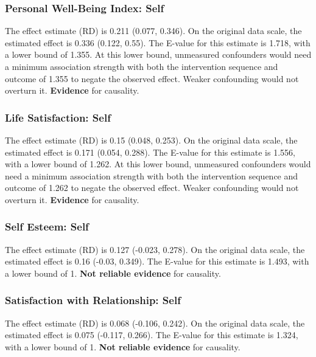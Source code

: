 \documentclass[
  singlecolumn]{article}
\begin{document}
\subsubsection{Personal Well-Being Index:
Self}\label{personal-well-being-index-self-11}

The effect estimate (RD) is 0.211 (0.077, 0.346). On the original data
scale, the estimated effect is 0.336 (0.122, 0.55). The E-value for this
estimate is 1.718, with a lower bound of 1.355. At this lower bound,
unmeasured confounders would need a minimum association strength with
both the intervention sequence and outcome of 1.355 to negate the
observed effect. Weaker confounding would not overturn it.
\textbf{Evidence} for causality.

\subsubsection{Life Satisfaction: Self}\label{life-satisfaction-self-11}

The effect estimate (RD) is 0.15 (0.048, 0.253). On the original data
scale, the estimated effect is 0.171 (0.054, 0.288). The E-value for
this estimate is 1.556, with a lower bound of 1.262. At this lower
bound, unmeasured confounders would need a minimum association strength
with both the intervention sequence and outcome of 1.262 to negate the
observed effect. Weaker confounding would not overturn it.
\textbf{Evidence} for causality.

\subsubsection{Self Esteem: Self}\label{self-esteem-self-11}

The effect estimate (RD) is 0.127 (-0.023, 0.278). On the original data
scale, the estimated effect is 0.16 (-0.03, 0.349). The E-value for this
estimate is 1.493, with a lower bound of 1. \textbf{Not reliable
evidence} for causality.

\subsubsection{Satisfaction with Relationship:
Self}\label{satisfaction-with-relationship-self-11}

The effect estimate (RD) is 0.068 (-0.106, 0.242). On the original data
scale, the estimated effect is 0.075 (-0.117, 0.266). The E-value for
this estimate is 1.324, with a lower bound of 1. \textbf{Not reliable
evidence} for causality.
\end{document}
